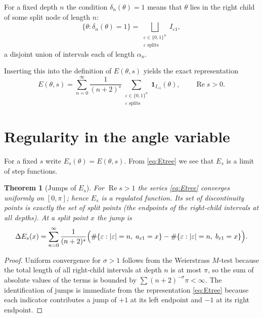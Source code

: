 \documentclass[11pt,a4paper]{article}
\newtheorem{theorem}{Theorem}[section]
\theoremstyle{definition}
\theoremstyle{remark}
\begin{document}
For a fixed depth \(n\) the condition \(\delta_n(\theta)=1\) means that \(\theta\) lies in the right child of some split node of length \(n\):
\[
\{\theta : \delta_n(\theta)=1\} = \bigsqcup_{\substack{\varepsilon\in\{0,1\}^n\\ \varepsilon\text{ splits}}} I_{\varepsilon 1},
\]
a disjoint union of intervals each of length \(\alpha_n\).

Inserting this into the definition of \(E(\theta,s)\) yields the exact representation
\begin{equation}\label{eq:Etree}
E(\theta,s) = \sum_{n=0}^{\infty} \frac{1}{(n+2)^s}
                \sum_{\substack{\varepsilon\in\{0,1\}^n\\ \varepsilon\text{ splits}}}
                \mathbf{1}_{I_{\varepsilon 1}}(\theta),
\qquad \operatorname{Re}s>0 .
\end{equation}

\section{Regularity in the angle variable}
For a fixed \(s\) write \(E_s(\theta)=E(\theta,s)\).  From \eqref{eq:Etree} we see that \(E_s\) is a limit of step functions.

\begin{theorem}[Jumps of \(E_s\)]\label{thm:jump}
For \(\operatorname{Re}s>1\) the series \eqref{eq:Etree} converges uniformly on \([0,\pi]\); hence \(E_s\) is a regulated function.
Its set of discontinuity points is exactly the set of split points (the endpoints of the right‑child intervals at all depths).
At a split point \(x\) the jump is
\[
\Delta E_s(x) = \sum_{n=0}^{\infty} \frac{1}{(n+2)^s}
                \Bigl( \#\{\varepsilon: |\varepsilon|=n, \; a_{\varepsilon 1}=x\}
                     - \#\{\varepsilon: |\varepsilon|=n, \; b_{\varepsilon 1}=x\} \Bigr).
\]
\end{theorem}
\begin{proof}
Uniform convergence for \(\sigma>1\) follows from the Weierstrass \(M\)-test because the total length of all right‑child intervals at depth \(n\) is at most \(\pi\), so the sum of absolute values of the terms is bounded by \(\sum (n+2)^{-\sigma}\pi<\infty\).
The identification of jumps is immediate from the representation \eqref{eq:Etree} because each indicator contributes a jump of \(+1\) at its left endpoint and \(-1\) at its right endpoint.
\end{proof}
\end{document}
